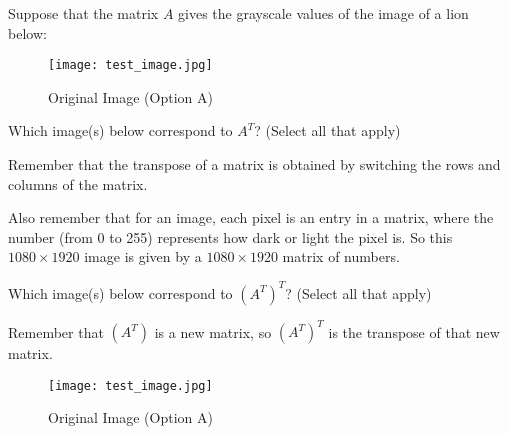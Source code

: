 \documentclass{ximera}
\author{Zack Reed}
\begin{document}
\begin{exercise}

  Suppose that the matrix $A$ gives the grayscale values of the image of a lion below:

  \begin{figure}[h]
    \centering
      \texttt{[image: test\_image.jpg]}
      \caption{Original Image (Option A)}
      \label{fig:original}
  \end{figure}
  
  Which image(s) below correspond to $A^T$? (Select all that apply)
  
  \begin{hint}
  
    Remember that the transpose of a matrix is obtained by switching the rows and columns of the matrix.

    Also remember that for an image, each pixel is an entry in a matrix, where the number (from 0 to 255) represents how dark or light the pixel is. So this $1080 \times 1920$ image is given by a $1080 \times 1920$ matrix of numbers.

  \end{hint}

  \begin{selectAll}
  
  
  \end{selectAll}
  
  Which image(s) below correspond to $(A^T)^T$? (Select all that apply)

  \begin{hint}
  
    Remember that $(A^T)$ is a new matrix, so $(A^T)^T$ is the transpose of that new matrix.

  \end{hint}
  
  \begin{selectAll}
  
  
  \end{selectAll}

  
    \begin{figure}[h]
      \centering
        \texttt{[image: test\_image.jpg]}
        \caption{Original Image (Option A)}
        \label{fig:original}
    \end{figure}
  

\end{exercise}
\end{document}
